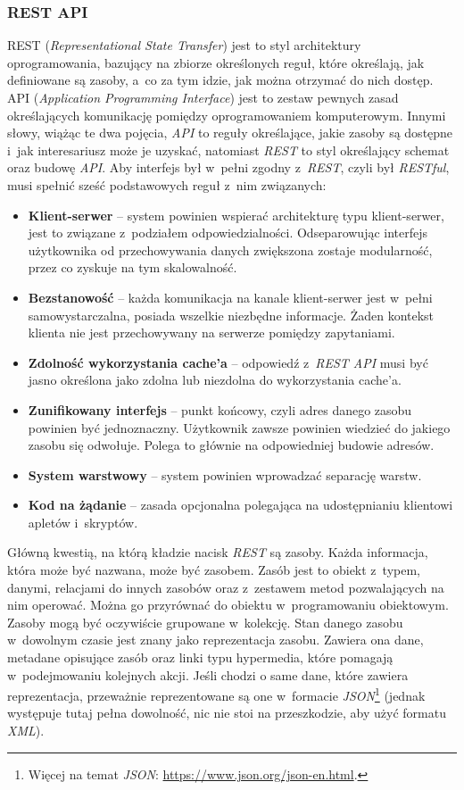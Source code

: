 \subsubsection{REST API}
\label{sec:rest}
REST (\emph{Representational State Transfer}) jest to styl architektury oprogramowania, bazujący na zbiorze określonych reguł, które określają, jak definiowane są zasoby, a~co za tym idzie, jak można otrzymać do nich dostęp. API (\emph{Application Programming Interface}) jest to zestaw pewnych zasad określających komunikację pomiędzy oprogramowaniem komputerowym. Innymi słowy, wiążąc te dwa pojęcia, \emph{API} to reguły określające, jakie zasoby są dostępne i~jak interesariusz może je uzyskać, natomiast \emph{REST} to styl określający schemat oraz budowę \emph{API}. Aby interfejs był w~pełni zgodny z~\emph{REST}, czyli był \emph{RESTful}, musi spełnić sześć podstawowych reguł z~nim związanych:
\begin{itemize}
    \item \textbf{Klient-serwer} -- system powinien wspierać architekturę typu klient-serwer, jest to związane z~podziałem odpowiedzialności. Odseparowując interfejs użytkownika od przechowywania danych zwiększona zostaje modularność, przez co zyskuje na tym skalowalność.
    \item \textbf{Bezstanowość} -- każda komunikacja na kanale klient-serwer jest w~pełni samowystarczalna, posiada wszelkie niezbędne informacje. Żaden kontekst klienta nie jest przechowywany na serwerze pomiędzy zapytaniami.
    \item \textbf{Zdolność wykorzystania cache'a} -- odpowiedź z~\emph{REST API} musi być jasno określona jako zdolna lub niezdolna do wykorzystania cache'a.
    \item \textbf{Zunifikowany interfejs} -- punkt końcowy, czyli adres danego zasobu powinien być jednoznaczny. Użytkownik zawsze powinien wiedzieć do jakiego zasobu się odwołuje. Polega to głównie na odpowiedniej budowie adresów.
    \item \textbf{System warstwowy} -- system powinien wprowadzać separację warstw.
    \item \textbf{Kod na żądanie} -- zasada opcjonalna polegająca na udostępnianiu klientowi apletów i~skryptów.
\end{itemize}

Główną kwestią, na którą kładzie nacisk \emph{REST} są zasoby. Każda informacja, która może być nazwana, może być zasobem. Zasób jest to obiekt z~typem, danymi, relacjami do innych zasobów oraz z~zestawem metod pozwalających na nim operować. Można go przyrównać do obiektu w~programowaniu obiektowym. Zasoby mogą być oczywiście grupowane w~kolekcję. Stan danego zasobu w~dowolnym czasie jest znany jako reprezentacja zasobu. Zawiera ona dane, metadane opisujące zasób oraz linki typu hypermedia, które pomagają w~podejmowaniu kolejnych akcji. Jeśli chodzi o same dane, które zawiera reprezentacja, przeważnie reprezentowane są one w~formacie \emph{JSON}\footnote{Więcej na temat \emph{JSON}: \url{https://www.json.org/json-en.html}.} (jednak występuje tutaj pełna dowolność, nic nie stoi na przeszkodzie, aby użyć formatu \emph{XML}). 

